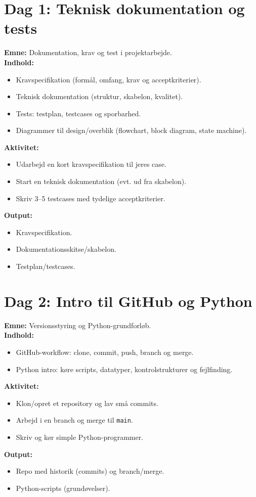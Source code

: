 \documentclass[a4paper,11pt]{article}
\begin{document}
\section{Dag 1: Teknisk dokumentation og tests}

\textbf{Emne:} Dokumentation, krav og test i projektarbejde.\\
\textbf{Indhold:}
\begin{itemize}
  \item Kravspecifikation (formål, omfang, krav og acceptkriterier).
  \item Teknisk dokumentation (struktur, skabelon, kvalitet).
  \item Tests: testplan, testcases og sporbarhed.
  \item Diagrammer til design/overblik (flowchart, block diagram, state machine).
\end{itemize}
\textbf{Aktivitet:}
\begin{itemize}
  \item Udarbejd en kort kravspecifikation til jeres case.
  \item Start en teknisk dokumentation (evt. ud fra skabelon).
  \item Skriv 3--5 testcases med tydelige acceptkriterier.
\end{itemize}
\textbf{Output:}
\begin{itemize}
  \item Kravspecifikation.
  \item Dokumentationsskitse/skabelon.
  \item Testplan/testcases.
\end{itemize}


\section{Dag 2: Intro til GitHub og Python}

\textbf{Emne:} Versionsstyring og Python-grundforløb.\\
\textbf{Indhold:}
\begin{itemize}
  \item GitHub-workflow: clone, commit, push, branch og merge.
  \item Python intro: køre scripts, datatyper, kontrolstrukturer og fejlfinding.
\end{itemize}
\textbf{Aktivitet:}
\begin{itemize}
  \item Klon/opret et repository og lav små commits.
  \item Arbejd i en branch og merge til \texttt{main}.
  \item Skriv og kør simple Python-programmer.
\end{itemize}
\textbf{Output:}
\begin{itemize}
  \item Repo med historik (commits) og branch/merge.
  \item Python-scripts (grundøvelser).
\end{itemize}
\end{document}
